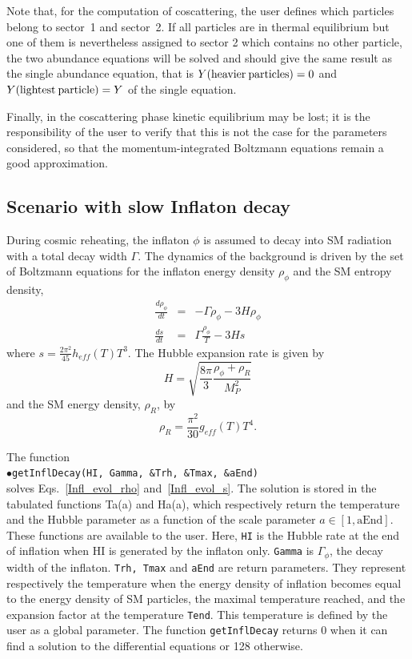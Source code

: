 \documentclass[12pt,a4paper]{article}
\begin{document}
 Note  that, for the computation of coscattering, the user defines which particles belong to sector~1 and sector~2.
If all particles are  in thermal equilibrium but one of them is nevertheless assigned to sector 2 which contains no other particle, the two abundance equations will be solved and should give the same result as the single abundance equation, that is $Y{\rm(heavier\:particles)}=0$ and $Y{\rm (lightest\:particle)}=Y$ of the single equation. 

Finally, in the coscattering phase kinetic equilibrium may be lost; 
it is the responsibility of the user to verify that this is not the case for the parameters considered, so that 
the momentum-integrated Boltzmann equations remain a good approximation. \\


\subsection{Scenario   with slow Inflaton decay}

During cosmic reheating, the inflaton $\phi$ is assumed to decay into SM radiation with a total
decay width $\Gamma$. The dynamics of the background is driven by the set of Boltzmann equations
for the inflaton energy density $\rho_\phi$ and the SM entropy density,~\cite{Gelmini:2006pw}
\begin{eqnarray}
\label{Infl_evol_rho}
  \frac{d\rho_\phi}{dt}&=& -\Gamma \rho_\phi -3H\rho_\phi\\
\label{Infl_evol_s}
   \frac{ds}{dt}&=&\Gamma\frac{\rho_\phi}{T} -3Hs
    \end{eqnarray}
 where  $s=\frac{2\pi^2}{45}h_{eff}(T)T^3$.
 The Hubble expansion rate is given by 
 \begin{equation}
   H=\sqrt{\frac{8\pi}{3} \frac{\rho_\phi + \rho_R}{M_P^2}}
   \end{equation}
   and the SM energy density, $\rho_R$, by
\begin{equation}   \rho_R=\frac{\pi^2}{30}g_{eff}(T) T^4.
\end{equation}

\noindent
The function \\
$\bullet$\verb|getInflDecay(HI, Gamma, &Trh, &Tmax, &aEnd)|\\
solves Eqs.~\eqref{Infl_evol_rho} and~\eqref{Infl_evol_s}.  The solution is stored in the tabulated functions Ta(a) and Ha(a), which respectively return the temperature and the Hubble parameter as a function of the scale parameter $a\in [1, \text{aEnd}]$. These functions are available to the user. Here, \verb|HI| is the Hubble rate at the end of inflation when HI is generated by the inflaton only. \verb|Gamma| is $\Gamma_\phi$, the decay width of the inflaton. \verb|Trh, Tmax| and \verb|aEnd| are return parameters. They represent respectively the temperature when the energy density of inflation becomes equal to the energy density of SM particles, the maximal temperature reached, and the expansion factor at the temperature \verb|Tend|. This temperature is defined by the user as a global parameter. The function \verb|getInflDecay| returns 0 when it can find a solution to the differential equations or 128 otherwise.
   
\end{document}
